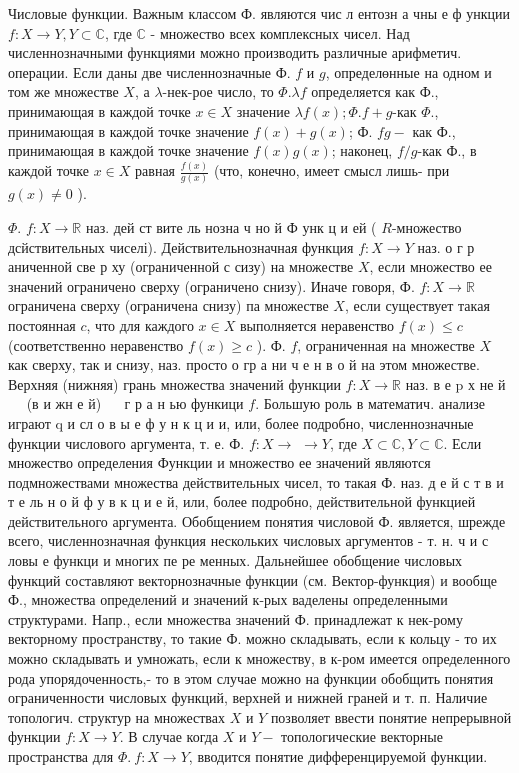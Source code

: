 \documentclass[10pt]{article}
\begin{document}
Числовые функции. Важным классом Ф. являются чис л ентозн а чны е ф ункции $f: X \longrightarrow Y, Y \subset \mathbb{C}$, где $\mathbb{C}$ - множество всех комплексных чисел. Над численнозначными функциями можно производить различные арифметич. операции. Если даны две численнозначные Ф. $f$ и $g$, определөнные на одном и том же множестве $X$, а $\lambda$-нек-рое число, то $\Phi . \lambda f$ определяется как Ф., принимающая в каждой точке $x \in X$ значение $\lambda f(x) ; \Phi . f+g$-как $\Phi .$, принимающая в каждой точке значение $f(x)+g(x)$; Ф. $f g-$ как Ф., принимающая в каждой точке значение $f(x) g(x)$; наконец, $f / g$-как Ф., в каждой точке $x \in X$ равная $\frac{f(x)}{g(x)}$ (что, конечно, имеет смысл лишь- при $g(x) \neq 0$ ).



$\Phi$. $f: X \longrightarrow \mathbb{R}$ наз. дей ст вите ль нозна ч но й Ф унк ц и ей ( $R$-множество дсйствительных чиселі). Действительнозначная функция $f: X \longrightarrow Y$ наз. о г р аниченной све р ху (ограниченной с сизу) на множестве $X$, если множество ее значений ограничено сверху (ограничено снизу). Иначе говоря, $Ф$. $f: X \longrightarrow \mathbb{R}$ ограничена сверху (ограничена снизу) па множестве $X$, если существует такая постоянная $c$, что для каждого $x \in X$ выполняется неравенство $f(x) \leqslant c$ (соответственно неравенство $f(x) \geqslant c$ ). Ф. $f$, ограниченная на множестве $X$ как сверху, так и снизу, наз. просто о гр а ни ч е н в о й на этом множестве. Верхняя (нижняя) грань множества значений функции $f: X \longrightarrow \mathbb{R}$ наз. в е $\mathrm{p}$ х не й $\quad$ (в и жн е й) $\quad$ г р а н ью функици $f$. Большую роль в математич. анализе играют q и сл о в ы е ф у н к ц и и, или, более подробно, численнозначные функции числового аргумента, т. е. Ф. $f: X \rightarrow$ $\rightarrow Y$, где $X \subset \mathbb{C}, Y \subset \mathbb{C}$. Если множество определения Функции и множество ее значений являются подмножествами множества действительных чисел, то такая Ф. наз. д е й с т в и т е ль н о й ф у в к ц и е й, или, более подробно, действительной функцией действительного аргумента. Обобщением понятия числовой Ф. является, шрежде всего, численнозначная функция нескольких числовых аргументов - т. н. ч и с ловы $е$ функци и многих пе ре менных. Дальнейшее обобщение числовых функций составляют векторнозначные функции (см. Вектор-функция) и вообще Ф., множества определений и значений к-рых ваделены определенными структурами. Напр., если множества значений Ф. принадлежат к нек-рому векторному пространству, то такие Ф. можно складывать, если к кольцу - то их можно складывать и умножать, если к множеству, в к-ром имеется определенного рода упорядоченность,- то в этом случае можно на функции обобщить понятия ограниченности числовых функций, верхней и нижней граней и т. п. Наличие топологич. структур на множествах $X$ и $Y$ позволяет ввести понятие непрерывной функции $f: X \rightarrow Y$. В случае когда $X$ и $Y-$ топологические векторные пространства для $\Phi . ~ f: X \rightarrow Y$, вводится понятие дифференцируемой функции.
\end{document}
